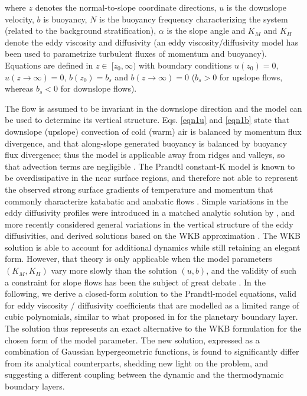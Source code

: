 %
where $z$ denotes the normal-to-slope coordinate directions, $u$ is the downslope velocity, $b$ is buoyancy, $N$ is the buoyancy frequency characterizing the system (related to the background stratification), $\alpha$ is the slope angle and $K_M$ and $K_H$ denote the eddy viscosity and diffusivity (an eddy viscosity/diffusivity model has been used to parametrize turbulent fluxes of momentum and buoyancy).
Equations are defined in $z \in \ [z_0,\infty)$ with boundary conditions $u(z_0)=0$, $u(z \rightarrow \infty) = 0$, $b(z_0)=b_s$ and $b(z \rightarrow \infty) = 0$ ($b_s > 0$ for upslope flows, whereas $b_s<0$ for downslope flows). 

The flow is assumed to be invariant in the downslope direction and the model can be used to determine its vertical structure.
Eqs. \ref{eqn1u} and \ref{eqn1b} state that downslope (upslope) convection of cold (warm) air is balanced by momentum flux divergence, and that along-slope generated buoyancy is balanced by buoyancy flux divergence; thus the model is applicable away from ridges and valleys, so that advection terms are negligible \citep{NAPPO1987}.
The Prandtl constant-K model is known to be overdissipative in the near surface regions, and therefore not able to represent the observed strong surface gradients of temperature and momentum that commonly characterize katabatic and anabatic flows \citep{Oerlemans1998, grisogono2001katabatic}. 
Simple variations in the eddy diffusivity profiles were introduced in a matched analytic solution by \citet{gutman_1983}, and more recently \citet{grisogono2001katabatic} considered general variations in the vertical structure of the eddy diffusivities, and derived  solutions based on the WKB approximation \citep{Bender1999}.
The WKB solution is able to account for additional dynamics while still retaining an elegant form.
However, that theory is only applicable when the model parameters $(K_M, K_H)$ vary more slowly than the solution $(u,b)$, and the validity of such a constraint for slope flows has been the subject of great debate \citep{Grisogono2002}.
In the following, we derive a closed-form solution to the Prandtl-model equations, valid for eddy viscosity / diffusivity coefficients that are modelled as a limited range of cubic polynomials, similar to what proposed in \citet{O'Brien1970} for the planetary boundary layer. 
The solution thus represents an exact alternative to the WKB formulation for the chosen form of the model parameter.
The new solution, expressed as a combination of Gaussian hypergeometric functions, is found to significantly differ from its analytical counterparts, shedding new light on the problem, and suggesting a different coupling between the dynamic and the thermodynamic boundary layers. 


